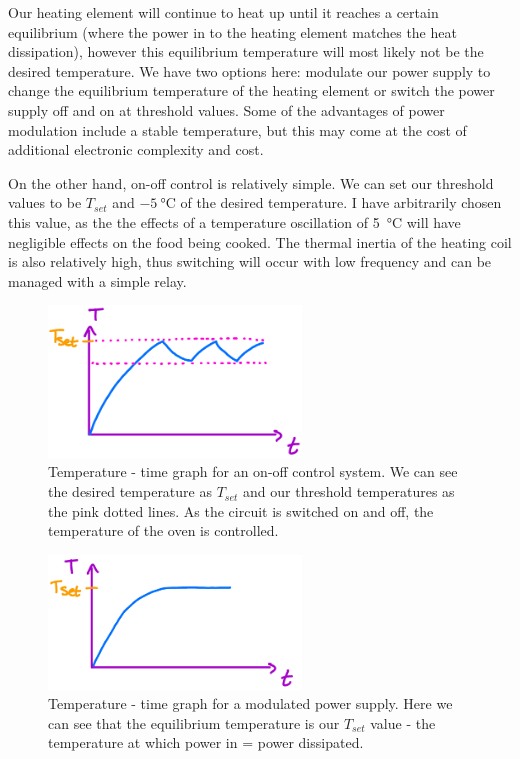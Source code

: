 \documentclass[12pt]{article}
\numberwithin{equation}{section}
\begin{document}
Our heating element will continue to heat up until it reaches a certain equilibrium (where the power in to the heating element matches the heat dissipation), however this equilibrium temperature will most likely not be the desired temperature. We have two options here: modulate our power supply to change the equilibrium temperature of the heating element or switch the power supply off and on at threshold values. Some of the advantages of power modulation include a stable temperature, but this may come at the cost of additional electronic complexity and cost. 

On the other hand, on-off control is relatively simple. We can set our threshold values to be $T_{set}$ and $\SI{-5}{\celsius}$ of the desired temperature. I have arbitrarily chosen this value, as the the effects of a temperature oscillation of \SI{5}{\celsius} will have negligible effects on the food being cooked. The thermal inertia of the heating coil is also relatively high, thus switching will occur with low frequency and can be managed with a simple relay.
\begin{figure}[H]
  \centering
  \includegraphics[width=0.6\textwidth]{./img/2-2graph.png}
  \caption{Temperature - time graph for an on-off control system. We can see the desired temperature as $T_{set}$ and our threshold temperatures as the pink dotted lines. As the circuit is switched on and off, the temperature of the oven is controlled.}
\end{figure}
\begin{figure}[H]
  \centering
  \includegraphics[width=0.6\textwidth]{./img/2-3graph.png}
  \caption{Temperature - time graph for a modulated power supply. Here we can see that the equilibrium temperature is our $T_{set}$ value - the temperature at which power in = power dissipated.}
\end{figure}
\end{document}
